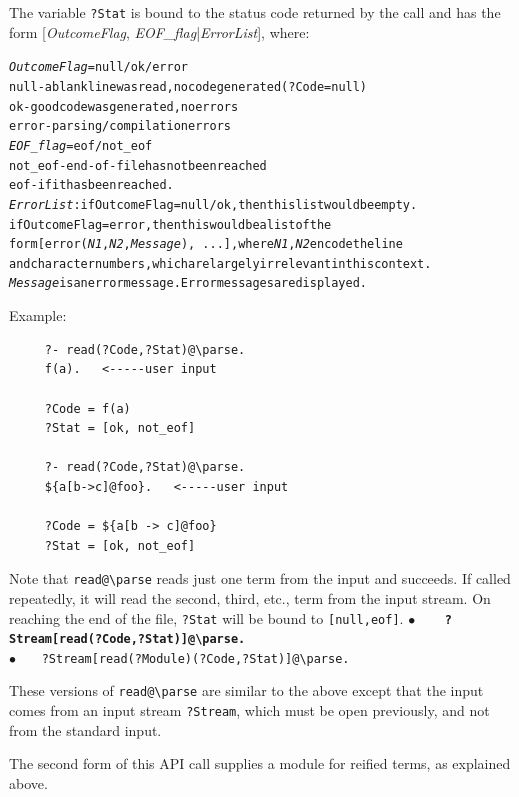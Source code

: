 \documentclass[11pt]{article}
\newcommand{\bs}{\textbackslash}
\begin{document}
\noindent
The variable {\tt ?Stat} is bound to the status code returned by the call
and has the form [\emph{OutcomeFlag}, \emph{EOF\_flag}|\emph{ErrorList}], where:
\begin{alltt}
{\rm \emph{OutcomeFlag} = null/ok/error
                  null  - a blank line was read, no code generated (?Code = null)
                  ok    - good code was generated, no errors
                  error - parsing/compilation errors
  \emph{EOF\_flag} = eof/not\_eof
                  not\_eof -  end-of-file has not been reached
                  eof       -  if it has been reached. 
  \emph{ErrorList}:  if OutcomeFlag=null/ok, then this list would be empty.
                  if OutcomeFlag=error, then this would be a list of the
                  form {\tt [error(\textnormal{\emph{N1}},\textnormal{\emph{N2}},\textnormal{\emph{Message}}), ...]}, where \emph{N1}, \emph{N2} encode the line
                  and character numbers, which are largely irrelevant in this context.
                  \emph{Message} is an error message. Error messages are displayed.}
\end{alltt}
Example:
\begin{verbatim}
     ?- read(?Code,?Stat)@\parse.
     f(a).   <-----user input

     ?Code = f(a)
     ?Stat = [ok, not_eof]

     ?- read(?Code,?Stat)@\parse.
     ${a[b->c]@foo}.   <-----user input

     ?Code = ${a[b -> c]@foo}
     ?Stat = [ok, not_eof]
\end{verbatim}

\noindent
Note that \texttt{read@\bs{}parse} reads just one term from the input and
succeeds. If called repeatedly, it will read the second, third, etc.,
  term from the input stream. On reaching the end of the file,
  \texttt{?Stat} will be bound to \texttt{[null,eof]}.  
\textbf{$\bullet$~~~ \tt  ?Stream[read(?Code,?Stat)]@\bs{}parse.} ~~\\
{$\bullet$~~~ \tt  ?Stream[read(?Module)(?Code,?Stat)]@\bs{}parse.} 

\noindent
These versions of \texttt{read@\bs{}parse} are similar to the above
  except that the input comes from an input stream \texttt{?Stream}, which
  must be open previously, and not from the standard input.

\noindent
The second form of this API call supplies a module for reified terms, as explained above.
\end{document}
